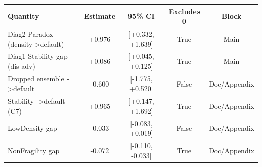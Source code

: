 \begin{tabular}{lcccc}
\toprule
Quantity & Estimate & 95\% CI & Excludes 0 & Block \\
\midrule
Diag2 Paradox (density->default) & +0.976 & [+0.332, +1.639] & True & Main \\
Diag1 Stability gap (dis-adv) & +0.086 & [+0.045, +0.125] & True & Main \\
[doc] Dropped ensemble ->default & -0.600 & [-1.775, +0.520] & False & Doc/Appendix \\
[doc] Stability ->default (C7) & +0.965 & [+0.147, +1.692] & True & Doc/Appendix \\
[appx] LowDensity gap & -0.033 & [-0.083, +0.019] & False & Doc/Appendix \\
[appx] NonFragility gap & -0.072 & [-0.110, -0.033] & True & Doc/Appendix \\
\bottomrule
\end{tabular}
